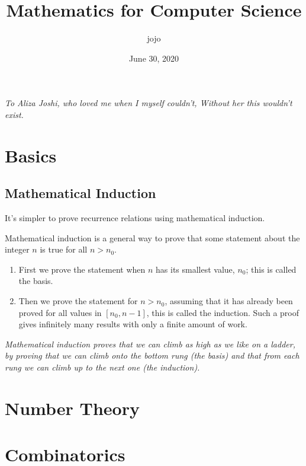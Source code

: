 \documentclass[letterpaper,12pt]{report}
\theoremstyle{definition}
\theoremstyle{remark}
\begin{document}
\title{Mathematics for Computer Science}
\author{jojo}
\date{June 30, 2020}
\maketitle

\newpage
\vspace*{8cm}
\begin{center}
	\large \emph{
		To Aliza Joshi,\linebreak 
		who loved me when I myself couldn't,\linebreak
		Without her this wouldn't exist.}
\end{center}

\tableofcontents

\part{Basics}
\chapter {Mathematical Induction}
It's simpler to prove recurrence relations using mathematical induction.

Mathematical induction is a general way to prove that some statement about the integer $n$ is true for all $n > n_0$. 
\begin{enumerate}
    \item First we prove the statement when $n$ has its smallest value, $n_0$; this is called the basis.
    \item Then we prove the statement for $n > n_0$, assuming that it has already been proved for all values in $ [n_0, n - 1]$, this is called the induction. Such a proof gives infinitely many results with only a finite amount of work. 
\end{enumerate}

\textit{Mathematical induction proves that we can climb as high as we like on a ladder, by proving that we can climb onto the bottom rung (the basis) and that from each rung we can climb up to the next one (the induction).}



\part {Number Theory}
\part {Combinatorics}
\end{document}
